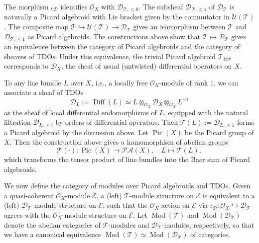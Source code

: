 \documentclass[11pt, a4paper]{amsart}
\newcommand{\C}{\mathbb{C}}
\newcommand{\cE}{\mathcal{E}}
\newcommand{\sD}{\mathscr{D}}
\DeclareMathOperator{\Diff}{Diff}
\DeclareMathOperator{\Pic}{Pic}
\DeclareMathOperator{\Mod}{Mod}
\newcommand{\TT}{\mathscr{T}}
\newcommand{\PicAlg}{\mathscr{PA}}
\newcommand{\OO}{\mathcal{O}}
\theoremstyle{definition}
\numberwithin{equation}{section}
\begin{document}
The morphism $\iota_{\sD}$ identifies $\OO_X$ with $\sD_{\TT, \leqslant 0}$.
The subsheaf $\sD_{\TT, \leqslant 1}$ of $\sD_\TT$ is naturally a Picard algebroid with Lie bracket given by the commutator in $\mathscr{U}(\TT)$.
The composite map $\TT \hookrightarrow \mathscr{U}(\TT) \to \sD_{\TT}$ gives an isomorphism between $\TT$ and $\sD_{\TT, \leqslant 1}$ as Picard algebroids. The constructions above show that $\TT \mapsto \sD_\TT$ gives an equivalence between the category of Picard algebroids and the category of sheaves of TDOs. Under this equivalence, the trivial Picard algebroid $\TT_{\operatorname{triv}}$ corresponds to $\sD_X$, the sheaf of usual (untwisted) differential operators on $X$.

To any line bundle $L$ over $X$, i.e., a locally free $\OO_X$-module of rank $1$, we can associate a sheaf of TDOs 
	\[ \sD_L := \Diff(L) \simeq L \otimes_{\OO_X} \sD_X \otimes_{\OO_X} L^{-1} \]
as the sheaf of local differential endomorphisms of $L$, equipped with the natural filtration $\sD_{L, \leqslant i}$ by orders of differential operators. Then $\TT(L) := \sD_{L, \leqslant 1}$ forms a Picard algebroid by the discussion above.
Let $\Pic(X)$ be the Picard group of $X$. Then the construction above gives a homomorphism of abelian groups
\begin{equation} \label{eq:Pic2PicAlg}
	\TT(\cdot): \Pic(X) \to \PicAlg(X), \quad L \mapsto \TT(L), 
\end{equation}
which transforms the tensor product of line bundles into the Baer sum of Picard algebroids. 


We now define the category of modules over Picard algebroids and TDOs. Given a quasi-coherent $\OO_X$-module $\cE$, a (left) $\TT$-module structure on $\cE$ is equivalent to a (left) $\sD_\TT$-module structure on $\cE$, such that the $\OO_X$-action on $\cE$ via $\iota_{\sD}: \OO_X \hookrightarrow \sD_{\TT}$ agrees with the $\OO_X$-module structure on $\cE$. Let $\Mod(\TT)$ and $\Mod(\sD_\TT)$ denote the abelian categories of $\TT$-modules and $\sD_\TT$-modules, respectively, so that we have a canonical equivalence $\Mod(\TT) \simeq \Mod(\sD_\TT)$ of categories. 
\end{document}
